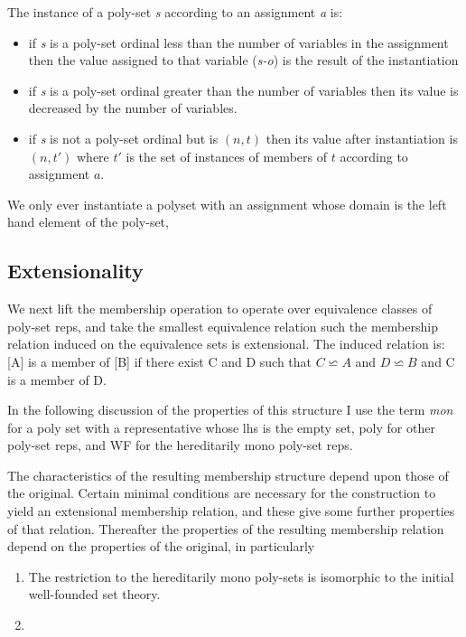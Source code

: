 \documentclass[numreferences]{rbjk}
\begin{document}
\begin{article}
The instance of a poly-set \emph{s} according to an assignment \emph{a} is:
\begin{itemize}
\item if \emph{s} is a poly-set ordinal less than the number of variables in the assignment then the value assigned to that variable (\emph{s-o}) is the result of the instantiation
\item if \emph{s} is a poly-set ordinal greater than the number of variables then its value is decreased by the number of variables.
\item if \emph{s} is not a poly-set ordinal but is $(n,t)$ then its value after instantiation is $(n,t')$ where $t'$ is the set of instances of members of $t$ according to assignment $a$.
\end{itemize}

We only ever instantiate a polyset with an assignment whose domain is the left hand element of the poly-set,

\subsection{Extensionality}

We next lift the membership operation to operate over equivalence classes of poly-set reps, and take the smallest equivalence relation such the membership relation induced on the equivalence sets is extensional.
The induced relation is: [A] is a member of [B] if there exist C and D such that $C \backsimeq A$ and $D \backsimeq B$ and C is a member of D.

In the following discussion of the properties of this structure I use the term {\it mon} for a poly set with a representative whose lhs is the empty set, poly for other poly-set reps, and WF for the hereditarily mono poly-set reps.

The characteristics of the resulting membership structure depend upon those of the original.
Certain minimal conditions are necessary for the construction to yield an extensional membership relation, and these give some further properties of that relation.
Thereafter the properties of the resulting membership relation depend on the properties of the original, in particularly 

\begin{enumerate}
\item The restriction to the hereditarily mono poly-sets is isomorphic to the initial well-founded set theory.
\item 
\end{enumerate}


\end{article}
\end{document}
